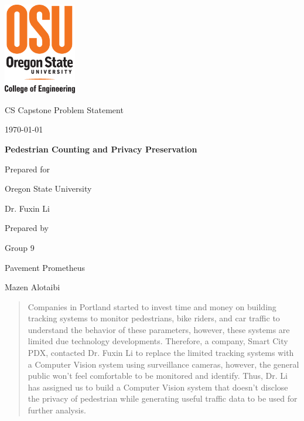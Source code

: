 \documentclass[onecolumn, draftclsnofoot,10pt, compsoc]{IEEEtran}
\def \CapstoneTeamName{		Pavement Prometheus}
\def \CapstoneTeamNumber{		9}
\def \GroupMemberOne{			Mazen Alotaibi}
\def \CapstoneProjectName{		Pedestrian Counting and Privacy Preservation}
\def \CapstoneSponsorCompany{	Oregon State University}
\def \CapstoneSponsorPerson{		Dr. Fuxin Li}
\def \DocType{		Problem Statement
				}
\newcommand{\NameSigPair}[1]{\par
\makebox[2.75in][r]{#1} \hfil 	\makebox[3.25in]{\makebox[2.25in]{\hrulefill} \hfill		\makebox[.75in]{\hrulefill}}
\par\vspace{-12pt} \textit{\tiny\noindent
\makebox[2.75in]{} \hfil		\makebox[3.25in]{\makebox[2.25in][r]{Signature} \hfill	\makebox[.75in][r]{Date}}}}
\renewcommand{\NameSigPair}[1]{#1}
\begin{document}
\begin{titlepage}
    \begin{singlespace}
    	\includegraphics[height=4cm]{coe_v_spot1}
        \hfill 
        \par\vspace{.2in}
        \centering
        \scshape{
            \huge CS Capstone \DocType \par
            {\large\today}\par
            \vspace{.5in}
            \textbf{\Huge\CapstoneProjectName}\par
            \vfill
            {\large Prepared for}\par
            \Huge \CapstoneSponsorCompany\par
            \vspace{5pt}
            {\Large\NameSigPair{\CapstoneSponsorPerson}\par}
            {\large Prepared by }\par
            Group\CapstoneTeamNumber\par
            \CapstoneTeamName\par 
            \vspace{5pt}
            {\Large
                \NameSigPair{\GroupMemberOne}\par
            }
            \vspace{20pt}
        }
        \begin{abstract}
        	Companies in Portland started to invest time and money on building tracking systems to monitor pedestrians, bike riders, and car traffic to understand the behavior of these parameters, however, these systems are limited due technology developments. Therefore,  a company, Smart City PDX, contacted Dr. Fuxin Li to replace the limited tracking systems with a Computer Vision system using surveillance cameras, however, the general public won't feel comfortable to be monitored and identify. Thus, Dr. Li \cite{li} has assigned us to build a Computer Vision system that doesn't disclose the privacy of pedestrian while generating useful traffic data to be used for further analysis.
        \end{abstract}     
    \end{singlespace}
\end{titlepage}
\newpage
{}
\tableofcontents
\clearpage
\end{document}
